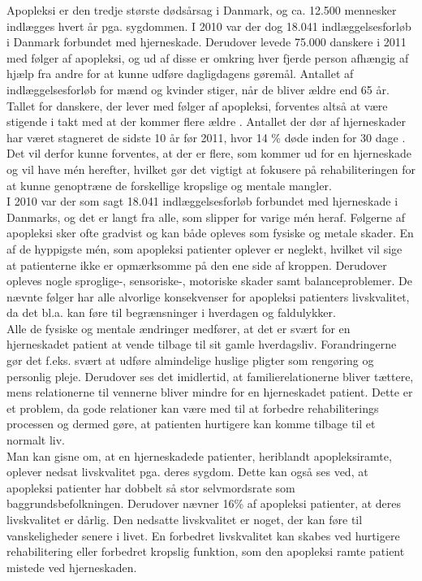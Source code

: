 Apopleksi er den tredje største dødsårsag i Danmark, og ca. 12.500 mennesker indlægges hvert år pga. sygdommen. I 2010 var der dog 18.041 indlæggelsesforløb i Danmark forbundet med hjerneskade. Derudover levede 75.000 danskere i 2011 med følger af apopleksi, og ud af disse er omkring hver fjerde person afhængig af hjælp fra andre for at kunne udføre dagligdagens gøremål.\cite{Hjernesagen2015a} Antallet af indlæggelsesforløb for mænd og kvinder stiger, når de bliver ældre end 65 år\cite{Sundhedsstyrelsen2011}. Tallet for danskere, der lever med følger af apopleksi, forventes altså at være stigende i takt med at der kommer flere ældre \cite{Sagen2014}. Antallet der dør af hjerneskader har været stagneret de sidste 10 år før 2011, hvor 14 \% døde inden for 30 dage \cite{Hjernesagen2015}. Det vil derfor kunne forventes, at der er flere, som kommer ud for en hjerneskade og vil have mén herefter, hvilket gør det vigtigt at fokusere på rehabiliteringen for at kunne genoptræne de forskellige kropslige og mentale mangler. \\
I 2010 var der som sagt 18.041 indlæggelsesforløb forbundet med hjerneskade i Danmarks, og det er langt fra alle, som slipper for varige mén heraf\cite{Sundhedsstyrelsen2011}. Følgerne af apopleksi sker ofte gradvist og kan både opleves som fysiske og metale skader\cite{Muus2008}. En af de hyppigste mén, som apopleksi patienter oplever er neglekt, hvilket vil sige at patienterne ikke er opmærksomme på den ene side af kroppen\cite{Sundhed.dk}. Derudover opleves nogle sproglige-, sensoriske-, motoriske skader samt balanceproblemer. De nævnte følger har alle alvorlige konsekvenser for apopleksi patienters livskvalitet, da det bl.a. kan føre til  begrænsninger i hverdagen og faldulykker.\cite{Nichols1997, Muus2008} \\
Alle de fysiske og mentale ændringer medfører, at det er svært for en hjerneskadet patient at vende tilbage til sit gamle hverdagsliv. Forandringerne gør det f.eks. svært at udføre almindelige huslige pligter som rengøring og personlig pleje. Derudover ses det imidlertid, at familierelationerne bliver tættere, mens relationerne til vennerne bliver mindre for en hjerneskadet patient. Dette er et problem, da gode relationer kan være med til at forbedre rehabiliterings processen og dermed gøre, at patienten hurtigere kan komme tilbage til et normalt liv.\cite{Sundhedsstyrelsen2010} \\
Man kan gisne om, at en hjerneskadede patienter, heriblandt apopleksiramte, oplever nedsat livskvalitet pga. deres sygdom. Dette kan også ses ved, at apopleksi patienter har dobbelt så stor selvmordsrate som baggrundsbefolkningen. Derudover nævner 16\% af apopleksi patienter, at deres livskvalitet er dårlig\cite{Sundhedsstyrelsen2010}. Den nedsatte livskvalitet er noget, der kan føre til vanskeligheder senere i livet. En forbedret livskvalitet kan skabes ved hurtigere rehabilitering eller forbedret kropslig funktion, som den apopleksi ramte patient mistede ved hjerneskaden.\cite{Sundhedsstyrelsen2010} \\
